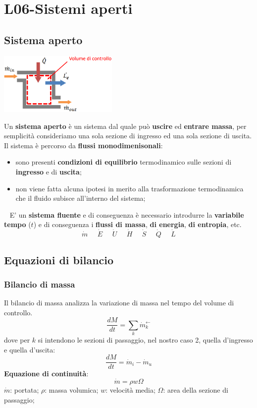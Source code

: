 \section{L06-Sistemi aperti}
\subsection{Sistema aperto}
\begin{center}
    \includegraphics[height=3cm]{../L06/img1.PNG}
\end{center}
Un \textbf{sistema aperto} è un sistema dal quale può \textbf{uscire} ed \textbf{entrare massa}, per semplicità consideriamo una sola sezione di ingresso ed una sola sezione di uscita.\newline
\newline
Il sistema è percorso da \textbf{flussi monodimenisonali}:
\begin{itemize}
    \item sono presenti \textbf{condizioni di equilibrio} termodinamico sulle sezioni di \textbf{ingresso} e di \textbf{uscita};
    \item non viene fatta alcuna ipotesi in merito alla trasformazione termodinamica che il fluido subisce all'interno del sistema;
\end{itemize}
\ \newline
E' un \textbf{sistema fluente} e di conseguenza è necessario introdurre la \textbf{variabile tempo} ($t$) e di conseguenza i \textbf{flussi di massa}, \textbf{di energia}, \textbf{di entropia}, etc.
\[
    \dot{m} \;\;\;\;\; \dot{E}\;\;\;\;\;\dot{U}\;\;\;\;\;\dot{H}\;\;\;\;\;\dot{S}\;\;\;\;\;\dot{Q}\;\;\;\;\;\dot{L}
\]
\subsection{Equazioni di bilancio}
\subsubsection{Bilancio di massa}
Il bilancio di massa analizza la variazione di massa nel tempo del volume di controllo.
\[
    \frac{dM}{dt} = \sum_{k} \dot{m}_k^\leftarrow
\]
dove per $k$ si intendono le sezioni di passaggio, nel nostro caso 2, quella d'ingresso e quella d'uscita:
\[
    \frac{dM}{dt} = \dot{m}_i - \dot{m}_u
\]
\textbf{Equazione di continuità}:
\[
    \dot{m}=\rho w \Omega
\]
$\dot{m}$: portata;\newline
$\rho$: massa volumica;\newline
$w$: velocità media;\newline
$\Omega$: area della sezione di passaggio;
